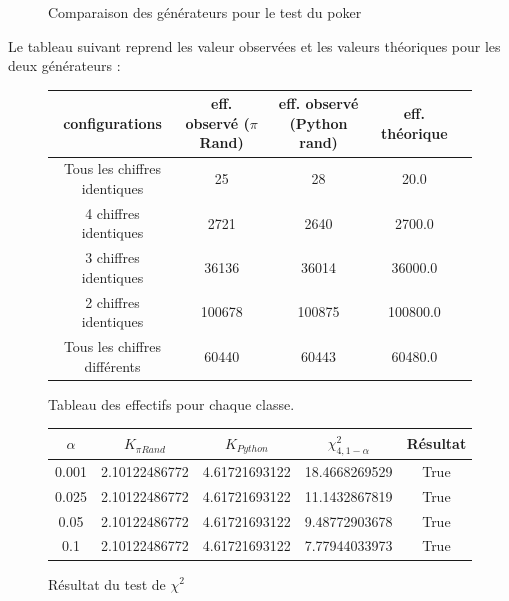 \documentclass[10pt,a4paper]{article}
\begin{document}
\begin{figure}[H]
\caption{Comparaison des générateurs pour le test du poker}
\label{poker_generator_histogram}
\end{figure}
Le tableau suivant reprend les valeur observées et les valeurs théoriques pour les deux générateurs :
\begin{figure}[H]
\begin{center}
\begin{longtable}{|c|c|c|c|c|}
\hline
configurations & eff. observé ($\pi$Rand) & eff. observé (Python rand) & eff. théorique\\
\hline


Tous les chiffres identiques  & 25 & 28 & 20.0\\
4 chiffres identiques & 2721 & 2640 & 2700.0\\
3 chiffres identiques & 36136 & 36014 & 36000.0\\
2 chiffres identiques & 100678 & 100875 & 100800.0\\
Tous les chiffres différents  & 60440 & 60443 & 60480.0\\
\hline
\end{longtable}
\end{center}
\caption{Tableau des effectifs pour chaque classe.}
\end{figure}
\begin{figure}[H]
\begin{center}
\begin{tabular}{|c|c|c|c|c|}
\hline
$\alpha$ & $K_{\pi Rand}$ & $K_{Python}$ & $\chi^2_{4, 1 - \alpha}$ & Résultat\\
\hline
0.001 & 2.10122486772 & 4.61721693122 & 18.4668269529 & True\\
0.025 & 2.10122486772 & 4.61721693122 & 11.1432867819 & True\\
0.05 & 2.10122486772 & 4.61721693122 & 9.48772903678 & True\\
0.1 & 2.10122486772 & 4.61721693122 & 7.77944033973 & True\\
\hline
\end{tabular}
\end{center}
\caption{Résultat du test de $\chi^2$}
\end{figure}
\end{document}
